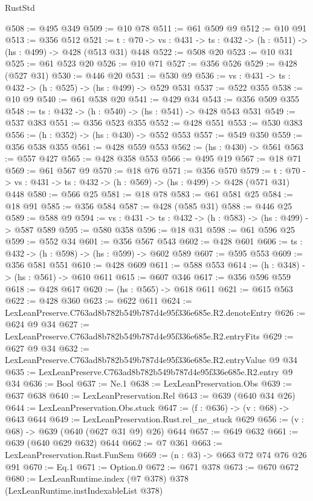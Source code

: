 \begin{lexlean}{RustStd}
\begin{coremodule}
@508 := @495 @349
@509 := @10 @78
@511 := @61 @509 @9
@512 := @10 @91
@513 := @356 @512
@521 := {t : @70} -> {vs : @431} -> {ts : @432} -> (h : @511) -> (hs : @499) -> @428 (@513 @31) @448
@522 := @508 @20
@523 := @10 @31
@525 := @61 @523 @20
@526 := @10 @71
@527 := @356 @526
@529 := @428 (@527 @31)
@530 := @446 @20
@531 := @530 @9
@536 := {vs : @431} -> {ts : @432} -> (h : @525) -> (hs : @499) -> @529 @531
@537 := @522 @355
@538 := @10 @9
@540 := @61 @538 @20
@541 := @429 @34
@543 := @356 @509 @355
@548 := {ts : @432} -> (h : @540) -> (hs : @541) -> @428 @543 @531
@549 := @537 @383
@551 := @356 @523 @355
@552 := @428 @551
@553 := @530 @383
@556 := (h : @352) -> (hs : @430) -> @552 @553
@557 := @549 @350
@559 := @356 @538 @355
@561 := @428 @559 @553
@562 := (hs : @430) -> @561
@563 := @557 @427
@565 := @428 @358 @553
@566 := @495 @19
@567 := @18 @71
@569 := @61 @567 @9
@570 := @18 @76
@571 := @356 @570
@579 := {t : @70} -> {vs : @431} -> {ts : @432} -> (h : @569) -> (hs : @499) -> @428 (@571 @31) @448
@580 := @566 @25
@581 := @18 @78
@583 := @61 @581 @25
@584 := @18 @91
@585 := @356 @584
@587 := @428 (@585 @31)
@588 := @446 @25
@589 := @588 @9
@594 := {vs : @431} -> {ts : @432} -> (h : @583) -> (hs : @499) -> @587 @589
@595 := @580 @358
@596 := @18 @31
@598 := @61 @596 @25
@599 := @552 @34
@601 := @356 @567 @543
@602 := @428 @601
@606 := {ts : @432} -> (h : @598) -> (hs : @599) -> @602 @589
@607 := @595 @553
@609 := @356 @581 @551
@610 := @428 @609
@611 := @588 @553
@614 := (h : @348) -> (hs : @561) -> @610 @611
@615 := @607 @346
@617 := @356 @596 @559
@618 := @428 @617
@620 := (hs : @565) -> @618 @611
@621 := @615 @563
@622 := @428 @360
@623 := @622 @611
@624 := LexLeanPreserve.C763ad8b782b549b787d4e95f336e685e.R2.denoteEntry
@626 := @624 @9 @34
@627 := LexLeanPreserve.C763ad8b782b549b787d4e95f336e685e.R2.entryFits
@629 := @627 @9 @34
@632 := LexLeanPreserve.C763ad8b782b549b787d4e95f336e685e.R2.entryValue @9 @34
@635 := LexLeanPreserve.C763ad8b782b549b787d4e95f336e685e.R2.entry @9 @34
@636 := Bool
@637 := Ne.{1}
@638 := LexLeanPreservation.Obs
@639 := @637 @638
@640 := LexLeanPreservation.Rel
@643 := @639 (@640 @34 @26)
@644 := LexLeanPreservation.Obs.stuck
@647 := (f : @636) -> (v : @68) -> @643 @644
@649 := LexLeanPreservation.Rust.rel_ne_stuck @629
@656 := (v : @68) -> @639 (@640 (@627 @31 @9) @26) @644
@657 := @649 @632
@661 := @639 (@640 @629 @632) @644
@662 := @7 @361
@663 := LexLeanPreservation.Rust.FunSem
@669 := (n : @3) -> @663 @72 @74 @76 @26 @91
@670 := Eq.{1}
@671 := Option.{0}
@672 := @671 @378
@673 := @670 @672
@680 := LexLeanRuntime.index (@7 @378) @378 (LexLeanRuntime.instIndexableList @378)

\end{coremodule}
\end{lexlean}
